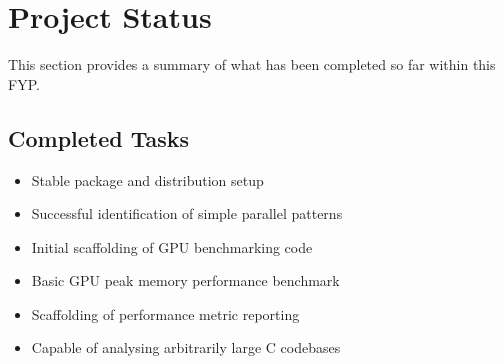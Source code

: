 
\section{Project Status}

This section provides a summary of what has been completed so far within this FYP.

\subsection{Completed Tasks}

\begin{itemize}
\item Stable package and distribution setup
\item Successful identification of simple parallel patterns
\item Initial scaffolding of GPU benchmarking code
\item Basic GPU peak memory performance benchmark
\item Scaffolding of performance metric reporting
\item Capable of analysing arbitrarily large C codebases
\end{itemize}

